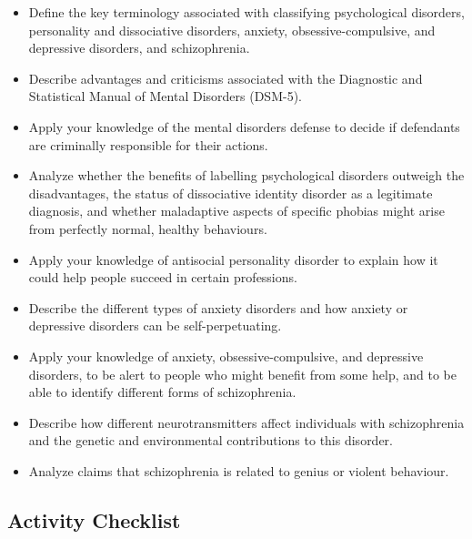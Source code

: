 \documentclass[
]{book}
\providecommand{\tightlist}{%
  \setlength{\itemsep}{0pt}\setlength{\parskip}{0pt}}
\begin{document}
\begin{itemize}
\tightlist
\item
  Define the key terminology associated with classifying psychological disorders, personality and dissociative disorders, anxiety, obsessive-compulsive, and depressive disorders, and schizophrenia.\\
\item
  Describe advantages and criticisms associated with the Diagnostic and Statistical Manual of Mental Disorders (DSM-5).\\
\item
  Apply your knowledge of the mental disorders defense to decide if defendants are criminally responsible for their actions.\\
\item
  Analyze whether the benefits of labelling psychological disorders outweigh the disadvantages, the status of dissociative identity disorder as a legitimate diagnosis, and whether maladaptive aspects of specific phobias might arise from perfectly normal, healthy behaviours.\\
\item
  Apply your knowledge of antisocial personality disorder to explain how it could help people succeed in certain professions.\\
\item
  Describe the different types of anxiety disorders and how anxiety or depressive disorders can be self-perpetuating.\\
\item
  Apply your knowledge of anxiety, obsessive-compulsive, and depressive disorders, to be alert to people who might benefit from some help, and to be able to identify different forms of schizophrenia.\\
\item
  Describe how different neurotransmitters affect individuals with schizophrenia and the genetic and environmental contributions to this disorder.
\item
  Analyze claims that schizophrenia is related to genius or violent behaviour.
\end{itemize}

\hypertarget{activity-checklist-8}{%
\subsection*{Activity Checklist}\label{activity-checklist-8}}
\end{document}

